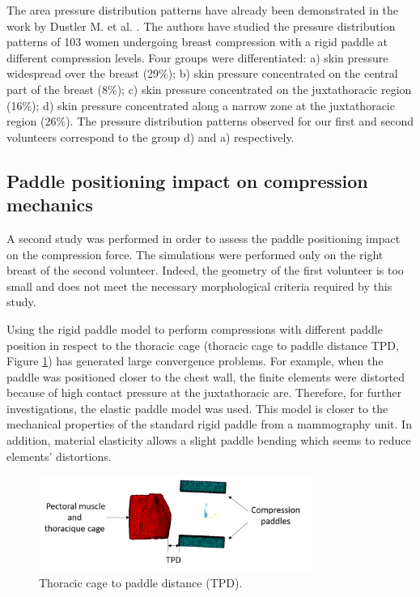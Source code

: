 The area pressure distribution patterns have already been demonstrated in the work by Dustler M. et al. \citep{dustler_breast_2012}. The authors have studied the pressure distribution patterns of 103 women undergoing breast compression with a rigid paddle at different compression levels. Four groups were differentiated: a) skin pressure widespread over the breast (29\%); b) skin pressure concentrated on the central part of the breast (8\%); c) skin pressure concentrated on the juxtathoracic region (16\%); d) skin pressure concentrated along a narrow zone at the juxtathoracic region (26\%).  The pressure distribution patterns observed for our first and second volunteers correspond to the group d) and a) respectively.


\clearpage
\subsection{Paddle positioning impact on compression mechanics}\label{subsection:breastpositioning}

A second study was performed in order to assess the paddle positioning impact on the compression force. The simulations were performed only on the right breast of the second volunteer. Indeed, the geometry of the first volunteer is too small and does not meet the necessary morphological criteria required by this study. 

Using the rigid paddle model to perform compressions with different paddle position in respect to the thoracic cage (thoracic cage to paddle distance TPD, Figure \ref{fig:elasticpaddle}) has generated large convergence problems. For example, when the paddle was positioned closer to the chest wall, the finite elements were distorted because of high contact pressure at the juxtathoracic are. Therefore, for further investigations, the elastic paddle model was used. This model is closer to the mechanical properties of the standard rigid paddle from a mammography unit.  In addition, material elasticity allows a slight paddle bending which seems to reduce elements' distortions. 

\begin{figure}[!h]
\centering
\includegraphics[width=0.8\textwidth,keepaspectratio]{figures/TPdistance.png} 
\caption{Thoracic cage to paddle distance (TPD).}\label{fig:elasticpaddle}
\end{figure}

